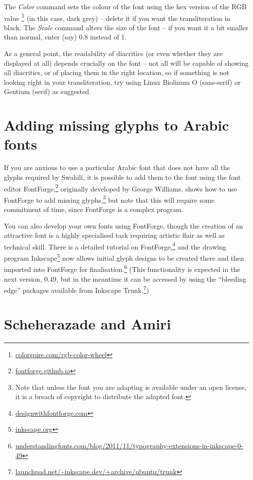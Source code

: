 The \textit{Color} command sets the colour of the font using the hex version of the RGB value \footnote{\url{colorspire.com/rgb-color-wheel}} (in this case, dark grey) -- delete it if you want the transliteration in black.  The \textit{Scale} command alters the size of the font -- if you want it a bit smaller than normal, enter (say) 0.8 instead of 1.

As a general point, the readability of diacritics (or even whether they are displayed at all) depends crucially on the font -- not all will be capable of showing all diacritics, or of placing them in the right location, so if something is not looking right in your transliteration, try using Linux Biolinum O (sans-serif) or Gentium (serif) as suggested. 

\section{Adding missing glyphs to Arabic fonts}

If you are anxious to use a particular Arabic font that does not have all the glyphs required by Swahili, it is possible to add them to the font using the font editor FontForge,\footnote{\url{fontforge.github.io}} originally developed by George Williams.   shows how to use FontForge to add missing glyphs,\footnote{Note that unless the font you are adapting is available under an open license, it is a breach of copyright to distribute the adapted font.} but note that this will require some commitment of time, since FontForge is a complex program.

You can also develop your own fonts using FontForge, though the creation of an attractive font is a highly specialised task requiring artistic flair as well as technical skill.   There is a detailed tutorial on FontForge,\footnote{\url{designwithfontforge.com}} and the drawing program Inkscape\footnote{\url{inkscape.org}} now allows initial glyph designs to be created there and then imported into FontForge for finalisation.\footnote{\url{understandingfonts.com/blog/2011/11/typography-extensions-in-inkscape-0-49}}  (This functionality is expected in the next version, 0.49, but in the meantime it can be accessed by using the ``bleeding edge'' packages available from Inkscape Trunk.\footnote{\url{launchpad.net/~inkscape.dev/+archive/ubuntu/trunk}})

\section{Scheherazade and Amiri}
\label{s:sham}

